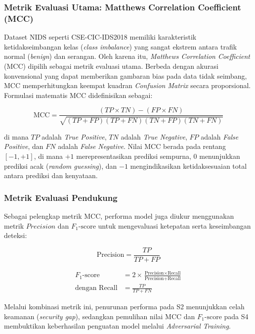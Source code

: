 \documentclass[11pt, a4paper]{article}
\begin{document}
\subsubsection{Metrik Evaluasi Utama: Matthews Correlation Coefficient (MCC)}
Dataset NIDS seperti CSE-CIC-IDS2018 memiliki karakteristik ketidakseimbangan kelas (\textit{class imbalance}) yang sangat ekstrem antara trafik normal (\textit{benign}) dan serangan. Oleh karena itu, \textit{Matthews Correlation Coefficient} (MCC) dipilih sebagai metrik evaluasi utama. Berbeda dengan akurasi konvensional yang dapat memberikan gambaran bias pada data tidak seimbang, MCC memperhitungkan keempat kuadran \textit{Confusion Matrix} secara proporsional. Formulasi matematis MCC didefinisikan sebagai:

\begin{equation}
\text{MCC} = \frac{(TP \times TN) - (FP \times FN)}{\sqrt{(TP + FP)(TP + FN)(TN + FP)(TN + FN)}}
\end{equation}

di mana $TP$ adalah \textit{True Positive}, $TN$ adalah \textit{True Negative}, $FP$ adalah \textit{False Positive}, dan $FN$ adalah \textit{False Negative}. Nilai MCC berada pada rentang $[-1, +1]$, di mana $+1$ merepresentasikan prediksi sempurna, $0$ menunjukkan prediksi acak (\textit{random guessing}), dan $-1$ mengindikasikan ketidaksesuaian total antara prediksi dan kenyataan.

\subsubsection{Metrik Evaluasi Pendukung}
Sebagai pelengkap metrik MCC, performa model juga diukur menggunakan metrik $Precision$ dan $F_1\text{-score}$ untuk mengevaluasi ketepatan serta keseimbangan deteksi:

\begin{equation}
\text{Precision} = \frac{TP}{TP + FP}
\end{equation}

\begin{align}
F_1\text{-score} &= 2 \times \frac{\text{Precision} \times \text{Recall}}{\text{Precision} + \text{Recall}} \\[6pt]
\text{dengan } \text{Recall} &= \frac{TP}{TP + FN}
\end{align}

Melalui kombinasi metrik ini, penurunan performa pada S2 menunjukkan celah keamanan (\textit{security gap}), sedangkan pemulihan nilai MCC dan $F_1\text{-score}$ pada S4 membuktikan keberhasilan penguatan model melalui \textit{Adversarial Training}.
\end{document}
